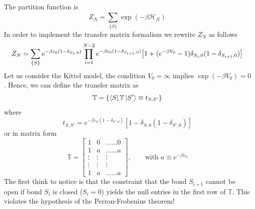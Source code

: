 \documentclass[../../Main/Main.tex]{subfiles}
\begin{document}
The partition function is
\begin{equation*}
  Z_N = \sum_{\{ S \}  }^{} \exp (-\beta \mathcal{H}_N)
\end{equation*}
In order to implement the transfer matrix formalism we rewrite \( Z_N \) as follows
\begin{equation}
  Z_N = \sum_{\{ S \}  }^{} e^{-\beta \varepsilon _0 (1- \delta _{S_1,0})}  \prod_{i=1}^{N-2} e^{-\beta \varepsilon _0 (1- \delta _{S_{i+1},0}) }  \qty[1 + (e^{-\beta V_0}-1 ) \delta _{S_i,0}(1- \delta _{S_{i+1},0})] 
\end{equation}
Let us consider the Kittel model, the condition \( V_0 = \infty  \) implies \( \exp (-\beta V_0) = 0  \). Hence, we can define the transfer matrix as
\begin{equation}
  \mathbb{T} = \{ \bra{S} \mathbb{T} \ket{S'} \equiv t_{S,S'}   \}
\end{equation}
where
\begin{equation}
t_{S,S'} = e^{-\beta \varepsilon _0 (1- \delta _{S',0})} [1 - \delta _{S,0} (1- \delta _{S',0})]
\end{equation}
or in matrix form
\begin{equation*}
  \mathbb{T} =
  \begin{bmatrix}
    1 & 0 & \dots \dots 0 \\
    1 & a & \dots \dots a \\
    \vdots & \vdots   & \vdots \\
        \vdots & \vdots &  \vdots \\
        1 & a & \dots \dots  a
  \end{bmatrix},
  \qquad \text{with } a \equiv e^{-\beta \varepsilon _0}
\end{equation*}
The first think to notice is that the constraint that the bond \( S_{i+1} \) cannot be open if bond \( S_i \) is closed (\( S_i =0 \)) yields the null entries in the first row of \( \mathbb{T} \). This violates the hypothesis of the Perron-Frobenius theorem!
\end{document}
